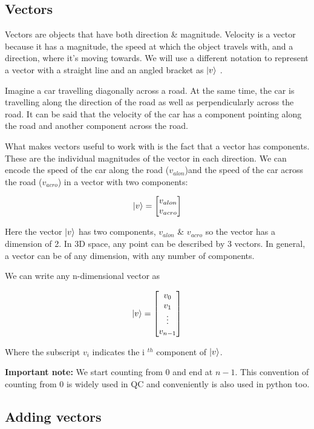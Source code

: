 \documentclass{book}
\begin{document}
\subsection{ Vectors}

Vectors are objects that have both direction \& magnitude. Velocity is a vector because it has a magnitude, the speed at which the object travels with, and a direction, where it's moving towards. We will use a different notation to represent a vector with a straight line and an angled bracket as $ \ket{v} $ .

Imagine a car travelling diagonally across a road. At the same time, the car is travelling along the direction of the road as well as perpendicularly across the road. It can be said that the velocity of the car has a component pointing along the road and another component across the road. 

What makes vectors useful to work with is the fact that a vector has components. These are the individual magnitudes of the vector in each direction. We can encode the speed of the car along the road ($v_{alon}$)and the speed of the car across the road ($v_{acro}$) in a vector with two components: 

$$
\ket{v} = \begin{bmatrix}v_{alon} \\ v_{acro}
\end{bmatrix}
$$

Here the vector $\ket{v}$ has two components, $v_{alon}$ \& $v_{acro}$ so the vector has a dimension of 2. In 3D space, any point can be described by 3 vectors. In general, a vector can be of any dimension, with any number of components. 

We can write any n-dimensional vector as

$$
\ket{v} = \begin{bmatrix} v_0 \\ v_1 \\ \vdots \\ v_{n-1} \end{bmatrix}
$$

Where the subscript $v_i$ indicates the i $^{th}$ component of $\ket{v}$. 

\textbf{Important note:} We start counting from 0 and end at $n-1$. This convention of counting from 0 is widely used in QC and conveniently is also used in python too. 

\subsection{ Adding vectors }
\end{document}
